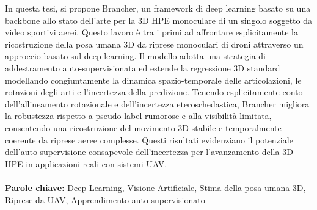 \documentclass{Configuration_Files/PoliMi3i_thesis}
\begin{document}
In questa tesi, si propone Brancher, un framework di deep learning basato su una backbone allo stato dell'arte per la 3D HPE monoculare di un singolo soggetto da video sportivi aerei. Questo lavoro è tra i primi ad affrontare esplicitamente 
la ricostruzione della posa umana 3D da riprese monoculari di droni attraverso un approccio basato sul deep learning. 
Il modello adotta una strategia di addestramento auto-supervisionata ed estende la regressione 3D standard modellando congiuntamente la dinamica spazio-temporale delle articolazioni, le rotazioni degli 
arti e l'incertezza della predizione. Tenendo esplicitamente conto dell'allineamento rotazionale e dell'incertezza eteroschedastica, Brancher migliora la robustezza rispetto a pseudo-label rumorose e alla 
visibilità limitata, consentendo una ricostruzione del movimento 3D stabile e temporalmente coerente da riprese aeree complesse. Questi risultati evidenziano il potenziale dell'auto-supervisione consapevole 
dell'incertezza per l'avanzamento della 3D HPE in applicazioni reali con sistemi UAV.
\\
\\
\textbf{Parole chiave:} Deep Learning, Visione Artificiale, Stima della posa umana 3D, Riprese da UAV, Apprendimento auto-supervisionato %


\thispagestyle{empty}
\tableofcontents %
\thispagestyle{empty}
\cleardoublepage

%
%
%    
%
\end{document}
